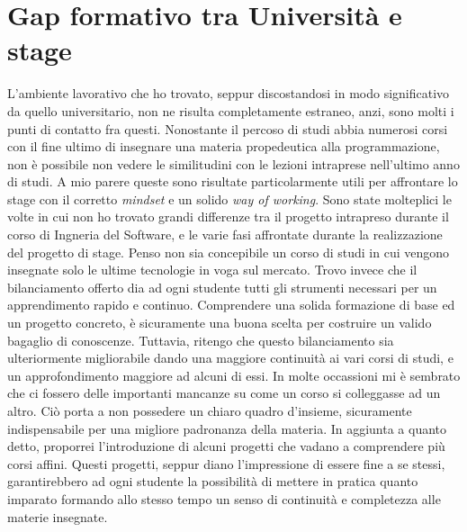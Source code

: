 \section{Gap formativo tra Università e stage}
L'ambiente lavorativo che ho trovato, seppur discostandosi in modo significativo da quello universitario, non ne risulta completamente estraneo, anzi, sono molti i punti di contatto fra questi.
Nonostante il percoso di studi abbia numerosi corsi con il fine ultimo di insegnare una materia propedeutica alla programmazione, non è possibile non vedere le similitudini
con le lezioni intraprese nell'ultimo anno di studi. A mio parere queste sono risultate particolarmente utili per affrontare lo stage con il corretto \emph{mindset} e un solido \emph{way of working}.
Sono state molteplici le volte in cui non ho trovato grandi differenze tra il progetto intrapreso durante il corso di Ingneria del Software, e le varie fasi affrontate durante la realizzazione
del progetto di stage. Penso non sia concepibile un corso di studi in cui vengono insegnate solo le ultime tecnologie in voga sul mercato. 
Trovo invece che il bilanciamento offerto dia ad ogni studente tutti gli strumenti necessari per un apprendimento rapido e continuo.
Comprendere una solida formazione di base ed un progetto concreto, è sicuramente una buona scelta per costruire un valido bagaglio di conoscenze.
Tuttavia, ritengo che questo bilanciamento sia ulteriormente migliorabile dando una maggiore continuità ai vari corsi di studi, e un approfondimento maggiore ad alcuni di essi. 
In molte occassioni mi è sembrato che ci fossero delle importanti mancanze su come un corso si colleggasse ad un altro. Ciò porta a non possedere un chiaro quadro d'insieme, sicuramente indispensabile
per una migliore padronanza della materia. In aggiunta a quanto detto, proporrei l'introduzione di alcuni progetti che vadano a comprendere più corsi affini.
Questi progetti, seppur diano l'impressione di essere fine a se stessi, garantirebbero ad ogni studente la possibilità di mettere in pratica quanto imparato formando allo stesso tempo un senso di continuità 
e completezza alle materie insegnate. 

%


